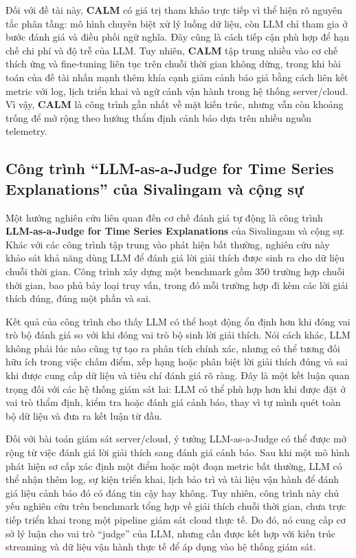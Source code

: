 Đối với đề tài này, \textbf{CALM} có giá trị tham khảo trực tiếp vì thể hiện rõ nguyên tắc phân tầng: mô hình chuyên biệt xử lý luồng dữ liệu, còn LLM chỉ tham gia ở bước đánh giá và điều phối ngữ nghĩa. Đây cũng là cách tiếp cận phù hợp để hạn chế chi phí và độ trễ của LLM. Tuy nhiên, \textbf{CALM} tập trung nhiều vào cơ chế thích ứng và fine-tuning liên tục trên chuỗi thời gian không dừng, trong khi bài toán của đề tài nhấn mạnh thêm khía cạnh giảm cảnh báo giả bằng cách liên kết metric với log, lịch triển khai và ngữ cảnh vận hành trong hệ thống server/cloud. Vì vậy, \textbf{CALM} là công trình gần nhất về mặt kiến trúc, nhưng vẫn còn khoảng trống để mở rộng theo hướng thẩm định cảnh báo dựa trên nhiều nguồn telemetry.

\subsection*{Công trình “LLM-as-a-Judge for Time Series Explanations” của Sivalingam và cộng sự}

Một hướng nghiên cứu liên quan đến cơ chế đánh giá tự động là công trình \textbf{LLM-as-a-Judge for Time Series Explanations} của Sivalingam và cộng sự. Khác với các công trình tập trung vào phát hiện bất thường, nghiên cứu này khảo sát khả năng dùng LLM để đánh giá lời giải thích được sinh ra cho dữ liệu chuỗi thời gian. Công trình xây dựng một benchmark gồm 350 trường hợp chuỗi thời gian, bao phủ bảy loại truy vấn, trong đó mỗi trường hợp đi kèm các lời giải thích đúng, đúng một phần và sai.

Kết quả của công trình cho thấy LLM có thể hoạt động ổn định hơn khi đóng vai trò bộ đánh giá so với khi đóng vai trò bộ sinh lời giải thích. Nói cách khác, LLM không phải lúc nào cũng tự tạo ra phân tích chính xác, nhưng có thể tương đối hữu ích trong việc chấm điểm, xếp hạng hoặc phân biệt lời giải thích đúng và sai khi được cung cấp dữ liệu và tiêu chí đánh giá rõ ràng. Đây là một kết luận quan trọng đối với các hệ thống giám sát lai: LLM có thể phù hợp hơn khi được đặt ở vai trò thẩm định, kiểm tra hoặc đánh giá cảnh báo, thay vì tự mình quét toàn bộ dữ liệu và đưa ra kết luận từ đầu.

Đối với bài toán giám sát server/cloud, ý tưởng LLM-as-a-Judge có thể được mở rộng từ việc đánh giá lời giải thích sang đánh giá cảnh báo. Sau khi một mô hình phát hiện sơ cấp xác định một điểm hoặc một đoạn metric bất thường, LLM có thể nhận thêm log, sự kiện triển khai, lịch bảo trì và tài liệu vận hành để đánh giá liệu cảnh báo đó có đáng tin cậy hay không. Tuy nhiên, công trình này chủ yếu nghiên cứu trên benchmark tổng hợp về giải thích chuỗi thời gian, chưa trực tiếp triển khai trong một pipeline giám sát cloud thực tế. Do đó, nó cung cấp cơ sở lý luận cho vai trò “judge” của LLM, nhưng cần được kết hợp với kiến trúc streaming và dữ liệu vận hành thực tế để áp dụng vào hệ thống giám sát.

